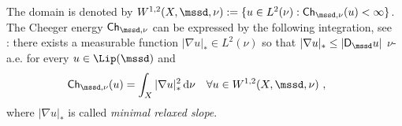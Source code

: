 \documentclass[11pt,letterpaper]{amsart}
\newcommand{\Ch}{\mathsf{Ch}}
\newcommand{\diff}{\mathop{}\!\mathrm{d}}
\newcommand{\comma}{\,\,\mathrm{,}\;\,}
\renewcommand{\1}{\mathbf 1}
\numberwithin{equation}{section}
\theoremstyle{plain}
\theoremstyle{definition}
\theoremstyle{remark}
\begin{document}
The domain is denoted by $W^{1,2}(X, \mssd, \nu):=\{u \in L^2(\nu): \Ch_{\mssd, \nu}(u)<\infty\}$.
The Cheeger energy $\Ch_{\mssd, \nu}$ 
can be expressed by the following integration, see~\cite[Thm.~4.5]{AmbGigSav14} 
: there exists a measurable function $|\nabla u|_* \in L^2(\nu)$ so that $|\nabla u|_* \le  |\mathsf D_{\mssd} u|$
$\nu$-a.e. for every $u \in \Lip(\mssd)$ and 
 \begin{align*}
 \Ch_{\mssd, \nu}(u)&=\int_X |\nabla u|_*^2 \diff\nu \quad \forall  u \in W^{1,2}(X, \mssd, \nu) \comma
 \end{align*}
 where $|\nabla u|_*$ is called {\it minimal relaxed slope}.%
 
\end{document}
